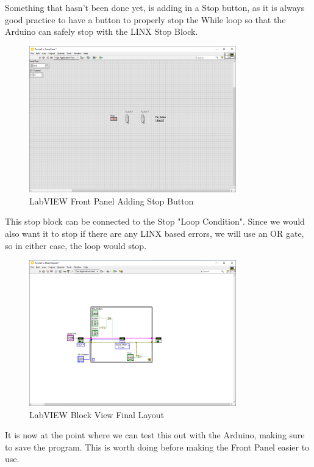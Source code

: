 \documentclass[a4paper,11pt]{report}
\begin{document}
Something that hasn't been done yet, is adding in a Stop button, as it is always good practice to have a button to properly stop the While loop so that the Arduino can safely stop with the LINX Stop Block.

\begin{figure}[H]
\centering
\includegraphics[width=0.8\textwidth]{screenshots/labview27}
\caption{LabVIEW Front Panel Adding Stop Button}
\end{figure}

This stop block can be connected to the Stop "Loop Condition". Since we would also want it to stop if there are any LINX based errors, we will use an OR gate, so in either case, the loop would stop.

\begin{figure}[H]
\centering
\includegraphics[width=0.8\textwidth]{screenshots/labview28}
\caption{LabVIEW Block View Final Layout}
\end{figure}

It is now at the point where we can test this out with the Arduino, making sure to save the program. This is worth doing before making the Front Panel easier to use.
\end{document}
